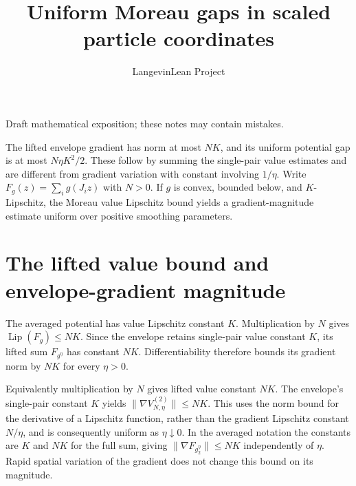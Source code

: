 \documentclass[11pt,a4paper]{article}
\title{\texorpdfstring{Uniform Moreau gaps in scaled particle coordinates}{Uniform Moreau gaps in scaled particle coordinates}}
\author{LangevinLean Project}
\date{}
\begin{document}
\maketitle
Draft mathematical exposition; these notes may contain mistakes.


The lifted envelope gradient has norm at most \(NK\), and its uniform potential gap is at most \(N\eta K^2/2\). These follow by summing the single-pair value estimates and are different from gradient variation with constant involving \(1/\eta\). Write \(F_g(z)=\sum_i g(J_i z)\) with \(N>0\). If \(g\) is convex, bounded below, and \(K\)-Lipschitz, the Moreau value Lipschitz bound yields a gradient-magnitude estimate uniform over positive smoothing parameters.


\section{\texorpdfstring{The lifted value bound and envelope-gradient magnitude}{The lifted value bound and envelope-gradient magnitude}}


The averaged potential has value Lipschitz constant \(K\). Multiplication by \(N\) gives \(\operatorname{Lip}(F_g)\le NK\). Since the envelope retains single-pair value constant \(K\), its lifted sum \(F_{g^\eta}\) has constant \(NK\). Differentiability therefore bounds its gradient norm by \(NK\) for every \(\eta>0\).



Equivalently multiplication by \(N\) gives lifted value constant \(NK\). The envelope’s single-pair constant \(K\) yields \(\|\nabla V_{N,\eta}^{(2)}\|\le NK\). This uses the norm bound for the derivative of a Lipschitz function, rather than the gradient Lipschitz constant \(N/\eta\), and is consequently uniform as \(\eta\downarrow0\). In the averaged notation the constants are \(K\) and \(NK\) for the full sum, giving \(\|\nabla F_{g_2^\eta}\|\le NK\) independently of \(\eta\). Rapid spatial variation of the gradient does not change this bound on its magnitude.
\end{document}
